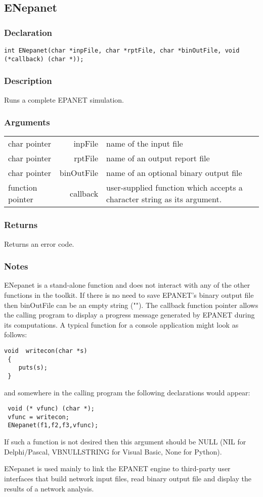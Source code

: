 \subsection{ENepanet}
\subsubsection{Declaration}
\begin{lstlisting}
int ENepanet(char *inpFile, char *rptFile, char *binOutFile, void (*callback) (char *));
\end{lstlisting}
\subsubsection{Description}
Runs a complete EPANET simulation.
\subsubsection{Arguments}
\begin{tabular}{l r p{11cm} }
char pointer&inpFile&name of the input file \\[6pt]
char pointer&rptFile&name of an output report file  \\[6pt]
char pointer&binOutFile&name of an optional binary output file \\[6pt]
function pointer& callback & user-supplied function which accepts a character string as its argument. \\[6pt]
\end{tabular}
\subsubsection{Returns}
Returns an error code.
\subsubsection{Notes}
ENepanet is a stand-alone function and does not interact with any of the other functions in the toolkit.
If there is no need to save EPANET's binary output file then binOutFile can be an empty string ("").
 The callback function pointer allows the calling program to display a progress message generated by EPANET 
 during its computations. A typical function for a console application might look as follows:
\begin{lstlisting}
void  writecon(char *s)
 {
    puts(s);
 }
\end{lstlisting}
  
and somewhere in the calling program the following declarations would appear:   
\begin{lstlisting}
 void (* vfunc) (char *);
 vfunc = writecon;
 ENepanet(f1,f2,f3,vfunc);
 \end{lstlisting}

If such a function is not desired then this argument should be NULL (NIL for Delphi/Pascal, 
 VBNULLSTRING for Visual Basic, None for Python).

 ENepanet is used mainly to link the EPANET engine to third-party user interfaces that build network 
 input files, read binary output file and display the results of a network analysis.